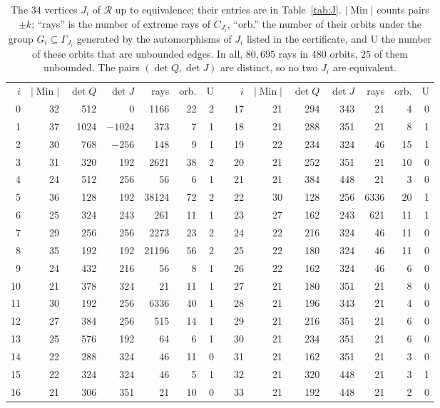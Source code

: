 \documentclass[11pt]{amsart}
\theoremstyle{definition}
\theoremstyle{remark}
\numberwithin{equation}{section}
\numberwithin{table}{section}
\numberwithin{figure}{section}
\newcommand{\Rk}{\mathcal{R}}
\newcommand{\Min}{\operatorname{Min}}
\begin{document}
\begin{table}[t]
\centering
\small
\renewcommand{\arraystretch}{1.05}
\setlength{\tabcolsep}{4.5pt}
\begin{tabular}{@{}r r r r r r r c r r r r r r r@{}}
\toprule
$i$ & $|\Min|$ & $\det Q$ & $\det J$ & rays & orb. & U & \hspace{6pt} & $i$ & $|\Min|$ & $\det Q$ & $\det J$ & rays & orb. & U\\
\cmidrule(r){1-7}\cmidrule(l){9-15}
0 & 32 & 512 & 0 & 1166 & 22 & 2 & & 17 & 21 & 294 & 343 & 21 & 4 & 0 \\
1 & 37 & 1024 & $-1024$ & 373 & 7 & 1 & & 18 & 21 & 288 & 351 & 21 & 8 & 1 \\
2 & 30 & 768 & $-256$ & 148 & 9 & 1 & & 19 & 22 & 234 & 324 & 46 & 15 & 1 \\
3 & 31 & 320 & 192 & 2621 & 38 & 2 & & 20 & 21 & 252 & 351 & 21 & 10 & 0 \\
4 & 24 & 512 & 256 & 56 & 6 & 1 & & 21 & 21 & 384 & 448 & 21 & 3 & 0 \\
5 & 36 & 128 & 192 & 38124 & 72 & 2 & & 22 & 30 & 128 & 256 & 6336 & 20 & 1 \\
6 & 25 & 324 & 243 & 261 & 11 & 1 & & 23 & 27 & 162 & 243 & 621 & 11 & 1 \\
7 & 29 & 256 & 256 & 2273 & 23 & 2 & & 24 & 22 & 216 & 324 & 46 & 11 & 0 \\
8 & 35 & 192 & 192 & 21196 & 56 & 2 & & 25 & 22 & 180 & 324 & 46 & 11 & 0 \\
9 & 24 & 432 & 216 & 56 & 8 & 1 & & 26 & 22 & 162 & 324 & 46 & 6 & 0 \\
10 & 21 & 378 & 324 & 21 & 11 & 1 & & 27 & 21 & 180 & 351 & 21 & 8 & 0 \\
11 & 30 & 192 & 256 & 6336 & 40 & 1 & & 28 & 21 & 196 & 343 & 21 & 4 & 0 \\
12 & 27 & 384 & 256 & 515 & 14 & 1 & & 29 & 21 & 216 & 351 & 21 & 6 & 0 \\
13 & 25 & 576 & 192 & 64 & 6 & 1 & & 30 & 21 & 234 & 351 & 21 & 6 & 0 \\
14 & 22 & 288 & 324 & 46 & 11 & 0 & & 31 & 21 & 162 & 351 & 21 & 3 & 0 \\
15 & 22 & 324 & 324 & 46 & 5 & 1 & & 32 & 21 & 320 & 448 & 21 & 3 & 1 \\
16 & 21 & 306 & 351 & 21 & 10 & 0 & & 33 & 21 & 192 & 448 & 21 & 2 & 0 \\
\bottomrule
\end{tabular}
\caption{The $34$ vertices $J_i$ of $\Rk$ up to equivalence; their entries are in Table~\ref{tab:J}. $|\Min|$ counts pairs $\pm k$; ``rays'' is the number of extreme rays of $C_{J_i}$, ``orb.'' the number of their orbits under the group $G_i\subseteq\Gamma_{J_i}$ generated by the automorphisms of $J_i$ listed in the certificate, and U the number of these orbits that are unbounded edges. In all, $80{,}695$ rays in $480$ orbits, $25$ of them unbounded. The pairs $(\det Q,\det J)$ are distinct, so no two $J_i$ are equivalent.}
\label{tab:vertices}
\end{table}
\end{document}
